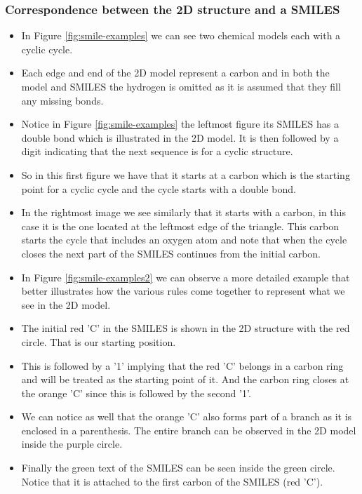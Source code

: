     \subsubsection{Correspondence between the 2D structure and a SMILES}
        \begin{itemize}
            \item In Figure \ref{fig:smile-examples} we can see two chemical models each with a cyclic cycle.
            \item Each edge and end of the 2D model represent a carbon and in both the model and SMILES the hydrogen is omitted as it is assumed that they fill any missing bonds.
            \item Notice in Figure \ref{fig:smile-examples} the leftmost figure its SMILES has a double bond which is illustrated in the 2D model. It is then followed by a digit indicating that the next sequence is for a cyclic structure. 
            \item So in this first figure we have that it starts at a carbon which is the starting point for a cyclic cycle and the cycle starts with a double bond. 
            \item In the rightmost image we see similarly that it starts with a carbon, in this case it is the one located at the leftmost edge of the triangle. This carbon starts the cycle that includes an oxygen atom and note that when the cycle closes the next part of the SMILES continues from the initial carbon.
            \item In Figure \ref{fig:smile-examples2} we can observe a more detailed example that better illustrates how the various rules come together to represent what we see in the 2D model.
            \item The initial red 'C' in the SMILES is shown in the 2D structure with the red circle. That is our starting position. 
            \item This is followed by a '1' implying that the red 'C' belongs in a carbon ring and will be treated as the starting point of it. And the carbon ring closes at the orange 'C' since this is followed by the second '1'.
            \item We can notice as well that the orange 'C' also forms part of a branch as it is enclosed in a parenthesis. The entire branch can be observed in the 2D model inside the purple circle.
            \item Finally the green text of the SMILES can be seen inside the green circle. Notice that it is attached to the first carbon of the SMILES (red 'C'). 
        \end{itemize}
    
